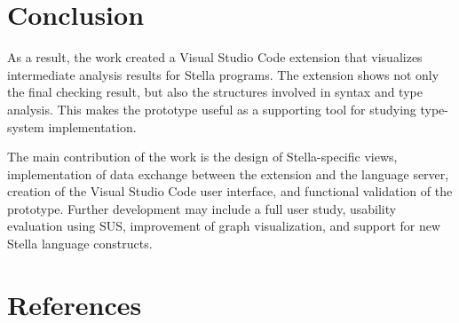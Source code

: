 ﻿\documentclass[14pt,a4paper]{extarticle}
\begin{document}
\section*{Conclusion}

As a result, the work created a Visual Studio Code extension that visualizes intermediate analysis results for Stella programs. The extension shows not only the final checking result, but also the structures involved in syntax and type analysis. This makes the prototype useful as a supporting tool for studying type-system implementation.

The main contribution of the work is the design of Stella-specific views, implementation of data exchange between the extension and the language server, creation of the Visual Studio Code user interface, and functional validation of the prototype. Further development may include a full user study, usability evaluation using SUS, improvement of graph visualization, and support for new Stella language constructs.
\section*{References}
\end{document}
